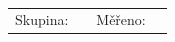 \documentclass[10pt]{scrartcl}
\begin{document}
\author{\Author}
\title{\Title}
\date{\Labdate}



\setlength{\parindent}{0cm}
\begin{multicols}{2}
\textsf{\textbf{\Subject \hspace{7.75cm} \Institute}\\
\textbf{\large{\Title}}}

\begin{tabular}{rlrl}
	 \textsf{Skupina:} & \textbf{\textsf\Author}    &   \textsf{Měřeno:} & \textbf{\textsf{\Labdate}}    
\end{tabular}

\begin{flushright}


\end{flushright}
\end{multicols}
\end{document}
